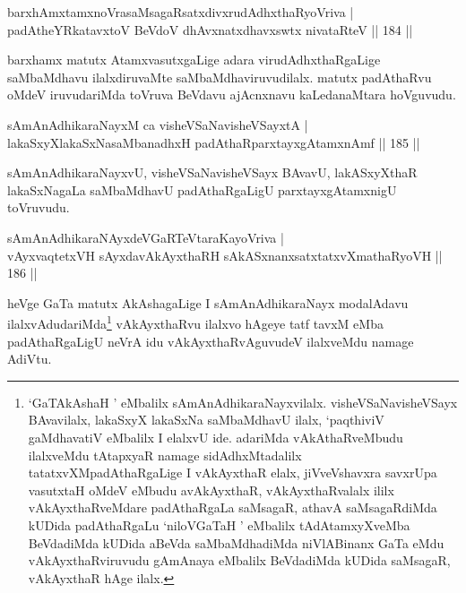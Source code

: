 \begin{shl}
barxhAmxtamxnoVrasaMsagaRsatxdivxrudAdhxthaRyoVriva |\\
padAtheYRkatavxtoV BeVdoV dhAvxnatxdhavxswtx nivataRteV \hfill || 184 ||
\end{shl}

\begin{artha}
barxhamx matutx AtamxvasutxgaLige adara virudAdhxthaRgaLige saMbaMdhavu ilalxdiruvaMte saMbaMdhaviruvudilalx. matutx padAthaRvu oMdeV iruvudariMda toVruva BeVdavu ajAcnxnavu kaLedanaMtara hoVguvudu.
\end{artha}


\begin{shl}
sAmAnAdhikaraNayxM ca visheVSaNavisheVSayxtA |\\
lakaSxyXlakaSxNasaMbanadhxH padAthaRparxtayxgAtamxnAmf \hfill || 185 ||
\end{shl}

\begin{artha}
sAmAnAdhikaraNayxvU, visheVSaNavisheVSayx BAvavU, lakASxyXthaR lakaSxNagaLa saMbaMdhavU padAthaRgaLigU parxtayxgAtamxnigU toVruvudu.
\end{artha}


\begin{shl}
sAmAnAdhikaraNAyxdeVGaRTeVtaraKayoVriva |\\
vAyxvaqtetxVH sAyxdavAkAyxthaRH sAkASxnanxsatxtatxvXmathaRyoVH \hfill || 186 ||
\end{shl}

\begin{artha}
heVge GaTa matutx AkAshagaLige I sAmAnAdhikaraNayx modalAdavu ilalxvAdudariMda\footnote{`GaTAkAshaH ' eMbalilx sAmAnAdhikaraNayxvilalx. visheVSaNavisheVSayx BAvavilalx, lakaSxyX lakaSxNa saMbaMdhavU ilalx, `paqthiviV gaMdhavatiV eMbalilx I elalxvU ide. adariMda vAkAthaRveMbudu ilalxveMdu tAtapxyaR namage sidAdhxMtadalilx tatatxvXMpadAthaRgaLige I vAkAyxthaR elalx, jiVveVshavxra savxrUpa vasutxtaH oMdeV eMbudu avAkAyxthaR, vAkAyxthaRvalalx ililx vAkAyxthaRveMdare padAthaRgaLa saMsagaR, athavA saMsagaRdiMda kUDida padAthaRgaLu `niloVGaTaH ' eMbalilx tAdAtamxyXveMba BeVdadiMda kUDida aBeVda saMbaMdhadiMda niVlABinanx GaTa eMdu vAkAyxthaRviruvudu gAmAnaya eMbalilx BeVdadiMda kUDida saMsagaR, vAkAyxthaR hAge ilalx.} vAkAyxthaRvu ilalxvo hAgeye tatf tavxM eMba padAthaRgaLigU neVrA idu vAkAyxthaRvAguvudeV ilalxveMdu namage AdiVtu.
\end{artha}

